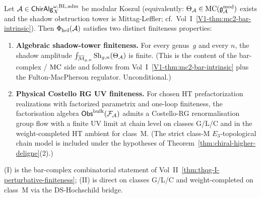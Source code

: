 \begin{theorem}
\label{thm:uhf-perturbative-finiteness-split}
Let $\mathcal{A} \in \mathsf{ChirAlg}^{\omega,\mathrm{BL,adm}}_X$ be modular Koszul
(equivalently: $\Theta_{\mathcal{A}} \in \mathrm{MC}(\mathfrak{g}^{\mathrm{mod}}_{\mathcal{A}})$
exists and the shadow obstruction tower is Mittag-Leffler; cf.\
Vol~I~\ref*{V1-thm:mc2-bar-intrinsic}). Then
$\Phi_{\mathrm{hol}}(\mathcal{A})$ satisfies two distinct finiteness
properties:
\begin{enumerate}[label=\textup{(\Roman*)}]
\item \textbf{Algebraic shadow-tower finiteness.} For every
 genus~$g$ and every $n$, the shadow amplitude
 $\int_{\overline{\mathcal{M}}_{g,n}} \mathrm{Sh}_{g,n}(\Theta_{\mathcal{A}})$
 is finite. \textup{(}This is the content of the bar-complex /
 $\mathrm{MC}$ side and follows from
 Vol~I~\ref*{V1-thm:mc2-bar-intrinsic} plus the Fulton-MacPherson
 regulator. Unconditional.\textup{)}
\item \textbf{Physical Costello RG UV finiteness.} For chosen HT
 prefactorization realizations with factorized parametrix and
 one-loop finiteness, the factorisation
 algebra $\mathsf{Obs}^{\mathrm{bulk}}(\mathcal{F}_{\mathcal{A}})$ admits a Costello-RG
	 renormalisation group flow with a finite UV limit at chain
	 level on classes G/L/C and in the weight-completed HT ambient for
	 class~M. \textup{(}The strict class-M $E_3$-topological chain model
	 is included under the hypotheses of
	 Theorem~\ref*{thm:chiral-higher-deligne}(2).\textup{)}
\end{enumerate}
(I) is the bar-complex combinatorial statement of
Vol~II~\ref*{thm:thqg-I-perturbative-finiteness};
(II) is direct on classes G/L/C and weight-completed on class~M via
the DS-Hochschild bridge.
\end{theorem}

